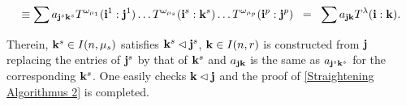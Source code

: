 \documentclass[twoside,12pt]{article}
\begin{document}
\[\equiv \sum a_{{\bf j}^s{\bf k}^s}
T^{\omega_{\mu_1}}({\bf i}^1:{\bf j}^1) \ldots
T^{\omega_{\mu_s}}({\bf i}^s:{\bf k}^s) \ldots
T^{\omega_{\mu_p}}({\bf i}^p:{\bf j}^p)\;\;
= \;\; \sum a_{{\bf j}{\bf k}}
 T^{\lambda}({\bf i}:{\bf k}).\]

Therein, ${\bf k}^s\in I(n,\mu_s)$ satisfies ${\bf k}^s\lhd{\bf j}^s$,
${\bf k}\in I(n,r)$ is constructed from ${\bf j}$ replacing the
entries of ${\bf j}^s$ by that of ${\bf k}^s$ and $a_{{\bf j}{\bf k}}$ is
the same as $a_{{\bf j}^s{\bf k}^s}$ for the corresponding ${\bf k}^s$.
One easily checks
${\bf k}\lhd{\bf j}$ and the proof of \ref{Straightening Algorithmus 2}
is completed.







\end{document}
